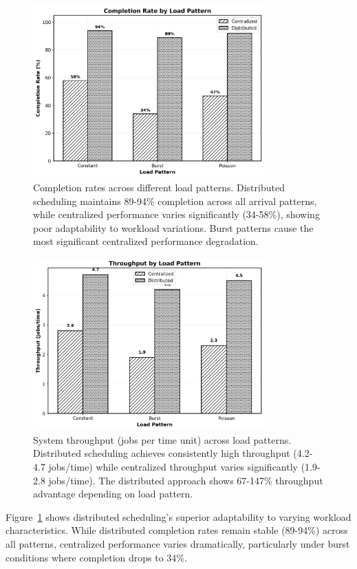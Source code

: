\documentclass[conference]{IEEEtran}
\begin{document}
\begin{figure}[!t]
\centering
\includegraphics[width=3.5in]{figure7_load_pattern_completion.png}
\caption{Completion rates across different load patterns. Distributed scheduling maintains 89-94\% completion across all arrival patterns, while centralized performance varies significantly (34-58\%), showing poor adaptability to workload variations. Burst patterns cause the most significant centralized performance degradation.}
\label{fig:load_pattern_completion}
\end{figure}

\begin{figure}[!t]
\centering
\includegraphics[width=3.5in]{figure8_load_pattern_throughput.png}
\caption{System throughput (jobs per time unit) across load patterns. Distributed scheduling achieves consistently high throughput (4.2-4.7 jobs/time) while centralized throughput varies significantly (1.9-2.8 jobs/time). The distributed approach shows 67-147\% throughput advantage depending on load pattern.}
\label{fig:load_pattern_throughput}
\end{figure}

Figure~\ref{fig:load_pattern_completion} shows distributed scheduling's superior adaptability to varying workload characteristics. While distributed completion rates remain stable (89-94\%) across all patterns, centralized performance varies dramatically, particularly under burst conditions where completion drops to 34\%.
\end{document}
